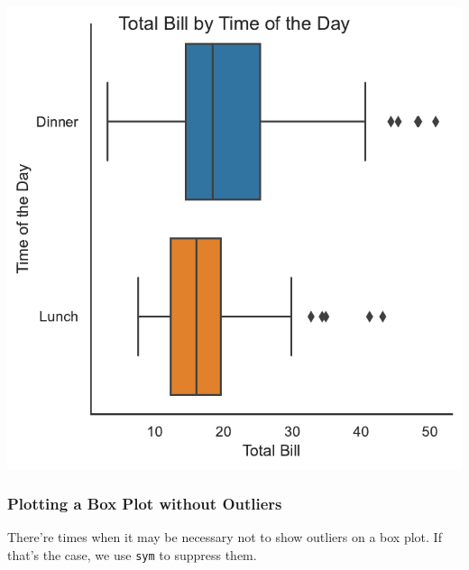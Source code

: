 \documentclass[
  letterpaper,
  DIV=11,
  numbers=noendperiod]{scrartcl}
\begin{document}
\includegraphics{data_visualization_with_seaborn_files/figure-pdf/cell-16-output-1.pdf}

\hypertarget{plotting-a-box-plot-without-outliers}{%
\subsubsection{Plotting a Box Plot without
Outliers}\label{plotting-a-box-plot-without-outliers}}

There're times when it may be necessary not to show outliers on a box
plot. If that's the case, we use \texttt{sym} to suppress them.
\end{document}
